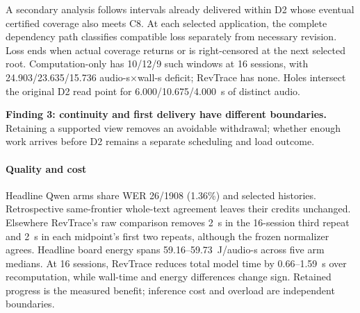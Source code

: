 A secondary analysis follows intervals already delivered within D2 whose
eventual certified coverage also meets C8. At each selected application,
the complete dependency path classifies compatible loss separately from
necessary revision. Loss ends when actual coverage returns or is
right-censored at the next selected root. Computation-only has 10/12/9
such windows at 16 sessions, with 24.903/23.635/15.736 audio-s$\times$wall-s
deficit; RevTrace has none. Holes intersect the original D2 read point
for 6.000/10.675/4.000~s of distinct audio.
\par\noindent\textbf{Finding 3: continuity and first delivery have different boundaries.}
Retaining a supported view removes an avoidable withdrawal; whether
enough work arrives before D2 remains a separate scheduling and load outcome.

\paragraph{Quality and cost}
Headline Qwen arms share WER 26/1908 (1.36\%) and selected histories.
Retrospective same-frontier whole-text agreement leaves their credits
unchanged. Elsewhere RevTrace's raw comparison removes 2~s in the 16-session third
repeat and 2~s in each midpoint's first two repeats, although the frozen
normalizer agrees. Headline board
energy spans 59.16--59.73~J/audio-s across five arm medians. At 16 sessions, RevTrace reduces total
model time by 0.66--1.59~s over recomputation, while wall-time and energy
differences change sign. Retained progress is the measured benefit;
inference cost and overload are independent boundaries.
